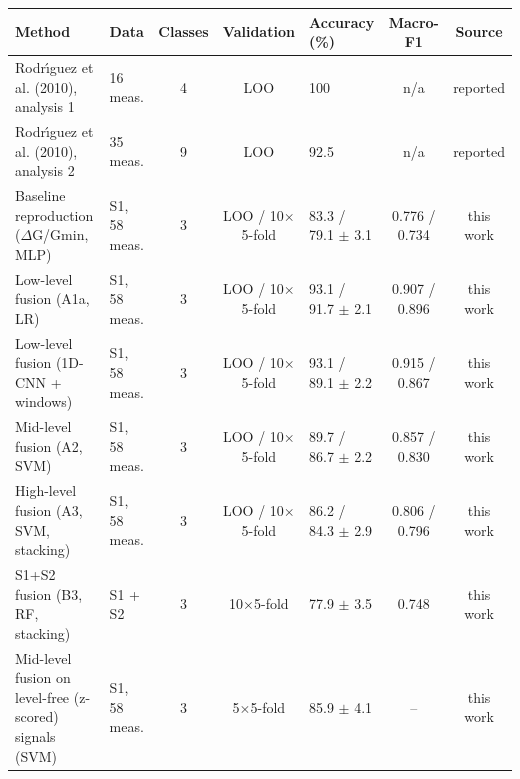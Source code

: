 \begin{tabular}{llcclcc}
\toprule
\textbf{Method} & \textbf{Data} & \textbf{Classes} & \textbf{Validation} & \textbf{Accuracy (\%)} & \textbf{Macro-F1} & \textbf{Source} \\
\midrule
Rodr\'{\i}guez et al. (2010), analysis 1 & 16 meas. & 4 & LOO & 100 & n/a & reported \\
Rodr\'{\i}guez et al. (2010), analysis 2 & 35 meas. & 9 & LOO & 92.5 & n/a & reported \\
Baseline reproduction ($\Delta$G/Gmin, MLP) & S1, 58 meas. & 3 & LOO / 10$\times$5-fold & 83.3 / 79.1 $\pm$ 3.1 & 0.776 / 0.734 & this work \\
Low-level fusion (A1a, LR) & S1, 58 meas. & 3 & LOO / 10$\times$5-fold & 93.1 / 91.7 $\pm$ 2.1 & 0.907 / 0.896 & this work \\
Low-level fusion (1D-CNN + windows) & S1, 58 meas. & 3 & LOO / 10$\times$5-fold & 93.1 / 89.1 $\pm$ 2.2 & 0.915 / 0.867 & this work \\
Mid-level fusion (A2, SVM) & S1, 58 meas. & 3 & LOO / 10$\times$5-fold & 89.7 / 86.7 $\pm$ 2.2 & 0.857 / 0.830 & this work \\
High-level fusion (A3, SVM, stacking) & S1, 58 meas. & 3 & LOO / 10$\times$5-fold & 86.2 / 84.3 $\pm$ 2.9 & 0.806 / 0.796 & this work \\
S1+S2 fusion (B3, RF, stacking) & S1 + S2 & 3 & 10$\times$5-fold & 77.9 $\pm$ 3.5 & 0.748 & this work \\
Mid-level fusion on level-free (z-scored) signals (SVM) & S1, 58 meas. & 3 & 5$\times$5-fold & 85.9 $\pm$ 4.1 & -- & this work \\
\bottomrule
\end{tabular}
